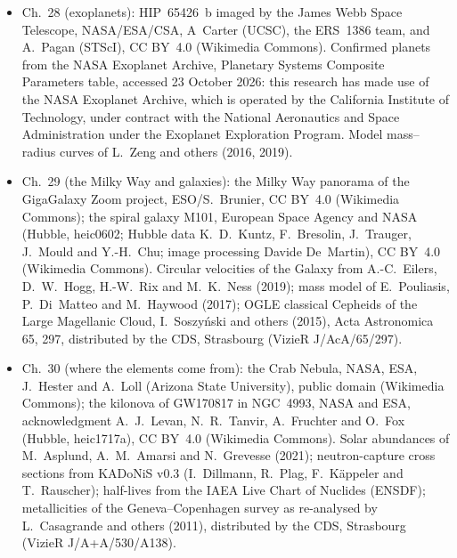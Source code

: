 \begin{itemize}
  \item Ch.~28 (exoplanets): HIP~65426~b imaged by the James Webb Space Telescope, NASA/ESA/CSA, A~Carter (UCSC), the ERS~1386 team, and A.~Pagan (STScI), CC BY~4.0 (Wikimedia Commons). Confirmed planets from the NASA Exoplanet Archive, Planetary Systems Composite Parameters table, accessed 23 October 2026: this research has made use of the NASA Exoplanet Archive, which is operated by the California Institute of Technology, under contract with the National Aeronautics and Space Administration under the Exoplanet Exploration Program. Model mass--radius curves of L.~Zeng and others (2016, 2019).
  \item Ch.~29 (the Milky Way and galaxies): the Milky Way panorama of the GigaGalaxy Zoom project, ESO/S.~Brunier, CC BY~4.0 (Wikimedia Commons); the spiral galaxy M101, European Space Agency and NASA (Hubble, heic0602; Hubble data K.~D.~Kuntz, F.~Bresolin, J.~Trauger, J.~Mould and Y.-H.~Chu; image processing Davide De~Martin), CC BY~4.0 (Wikimedia Commons). Circular velocities of the Galaxy from A.-C.~Eilers, D.~W.~Hogg, H.-W.~Rix and M.~K.~Ness (2019); mass model of E.~Pouliasis, P.~Di~Matteo and M.~Haywood (2017); OGLE classical Cepheids of the Large Magellanic Cloud, I.~Soszy\'nski and others (2015), Acta Astronomica 65, 297, distributed by the CDS, Strasbourg (VizieR J/AcA/65/297).
  \item Ch.~30 (where the elements come from): the Crab Nebula, NASA, ESA, J.~Hester and A.~Loll (Arizona State University), public domain (Wikimedia Commons); the kilonova of GW170817 in NGC~4993, NASA and ESA, acknowledgment A.~J.~Levan, N.~R.~Tanvir, A.~Fruchter and O.~Fox (Hubble, heic1717a), CC BY~4.0 (Wikimedia Commons). Solar abundances of M.~Asplund, A.~M.~Amarsi and N.~Grevesse (2021); neutron-capture cross sections from KADoNiS v0.3 (I.~Dillmann, R.~Plag, F.~K\"appeler and T.~Rauscher); half-lives from the IAEA Live Chart of Nuclides (ENSDF); metallicities of the Geneva--Copenhagen survey as re-analysed by L.~Casagrande and others (2011), distributed by the CDS, Strasbourg (VizieR J/A+A/530/A138).
\end{itemize}
